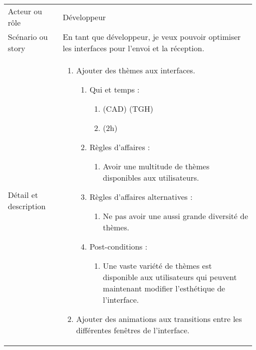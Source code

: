 \begin{longtable}{|l|p{}|}
\hline
    \rowcolor{Gray}
    \multicolumn{2}{|l|}{3} \\
\hline
    Acteur ou rôle & Développeur \\
\hline
    Scénario ou story & En tant que développeur, je veux pouvoir optimiser les interfaces pour l’envoi et la réception. \\
\hline
    Détail et description &
        \begin{enumerate}[label*=\arabic*.]
            \item Ajouter des thèmes aux interfaces.
                \begin{enumerate}[label*=\arabic*.]
                                \item Qui et temps :
                                \begin{enumerate}[label*=\arabic*.]
                                    \item (CAD) (TGH)
                                    \item (2h)
                                \end{enumerate}
                                \item Règles d'affaires :
                                \begin{enumerate}[label*=\arabic*.]
                                    \item Avoir une multitude de thèmes disponibles aux utilisateurs.
                                \end{enumerate}
                                \item Règles d'affaires alternatives :
                                \begin{enumerate}[label*=\arabic*.]
                                    \item Ne pas avoir une aussi grande diversité de thèmes.
                                \end{enumerate}
                                \item Post-conditions :
                                \begin{enumerate}[label*=\arabic*.]
                                    \item Une vaste variété de thèmes est disponible aux utilisateurs qui peuvent maintenant modifier l'esthétique de l'interface.
                                \end{enumerate}
                            \end{enumerate}
             \item  Ajouter des animations aux transitions entre les différentes fenêtres de l'interface.

\end{enumerate}
\end{longtable}
